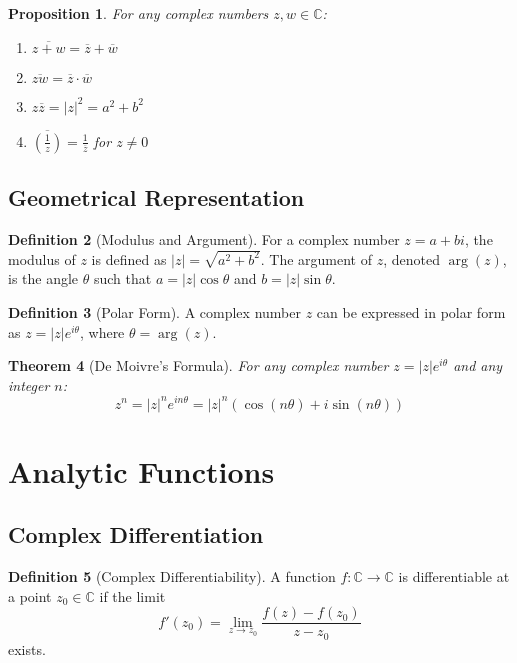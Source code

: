\documentclass[12pt,a4paper]{article}
\theoremstyle{plain}
\newtheorem{theorem}{Theorem}[section]
\newtheorem{proposition}[theorem]{Proposition}
\theoremstyle{definition}
\newtheorem{definition}[theorem]{Definition}
\begin{document}
\begin{proposition}
For any complex numbers $z, w \in \mathbb{C}$:
\begin{enumerate}[label=(\roman*)]
\item $\overline{z + w} = \overline{z} + \overline{w}$
\item $\overline{zw} = \overline{z} \cdot \overline{w}$
\item $z\overline{z} = |z|^2 = a^2 + b^2$
\item $\overline{\left(\frac{1}{z}\right)} = \frac{1}{\overline{z}}$ for $z \neq 0$
\end{enumerate}
\end{proposition}

\subsection{Geometrical Representation}

\begin{definition}[Modulus and Argument]
For a complex number $z = a + bi$, the modulus of $z$ is defined as $|z| = \sqrt{a^2 + b^2}$. The argument of $z$, denoted $\arg(z)$, is the angle $\theta$ such that $a = |z|\cos\theta$ and $b = |z|\sin\theta$.
\end{definition}

\begin{definition}[Polar Form]
A complex number $z$ can be expressed in polar form as $z = |z|e^{i\theta}$, where $\theta = \arg(z)$.
\end{definition}

\begin{theorem}[De Moivre's Formula]
For any complex number $z = |z|e^{i\theta}$ and any integer $n$:
\[z^n = |z|^n e^{in\theta} = |z|^n(\cos(n\theta) + i\sin(n\theta))\]
\end{theorem}

\section{Analytic Functions}

\subsection{Complex Differentiation}

\begin{definition}[Complex Differentiability]
A function $f: \mathbb{C} \to \mathbb{C}$ is differentiable at a point $z_0 \in \mathbb{C}$ if the limit
\[f'(z_0) = \lim_{z \to z_0} \frac{f(z) - f(z_0)}{z - z_0}\]
exists.
\end{definition}
\end{document}
